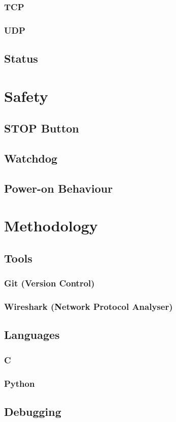 			\subsubsection{TCP}
			
			\subsubsection{UDP}
		
		\subsection{Status}
	
	\section{Safety}
		
		\subsection{STOP Button}
		
		\subsection{Watchdog}
		
		\subsection{Power-on Behaviour}
	
	\section{Methodology}
		
		\subsection{Tools}
			
			\subsubsection{Git (Version Control)}
			
			\subsubsection{Wireshark (Network Protocol Analyser)}
		
		\subsection{Languages}
			
			\subsubsection{C}
			
			\subsubsection{Python}
		
		\subsection{Debugging}
